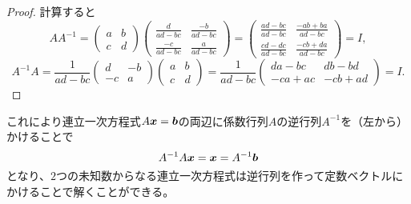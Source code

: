 \begin{proof}
計算すると
$$
A A^{-1}
= \begin{pmatrix}a & b \\ c & d\end{pmatrix}\begin{pmatrix}\frac{d}{a d-b c} & \frac{-b}{a d-b c} \\ \frac{-c}{a d-b c} & \frac{a}{a d-b c}\end{pmatrix}
= \begin{pmatrix}\frac{a d-b c}{a d-b c} & \frac{-a b+b a}{a d-b c} \\ \frac{c d-d c}{a d-b c} & \frac{-c b+d a}{a d-b c}\end{pmatrix}
= I,
$$
$$
A^{-1} A
= \frac{1}{a d-b c}\begin{pmatrix}d & -b \\ -c & a\end{pmatrix}\begin{pmatrix}a & b \\ c & d\end{pmatrix}
= \frac{1}{a d-b c}\begin{pmatrix}d a-b c & d b-b d \\ -c a+a c & -c b+a d\end{pmatrix}
= I.
$$
\end{proof}

これにより連立一次方程式$A \vb*{x} = \vb*{b}$の両辺に係数行列$A$の逆行列$A^{-1}$を（左から）かけることで
$$
A^{-1} A \vb*{x} = \vb*{x} = A^{-1} \vb*{b}
$$
となり、$2$つの未知数からなる連立一次方程式は逆行列を作って定数ベクトルにかけることで解くことができる。

